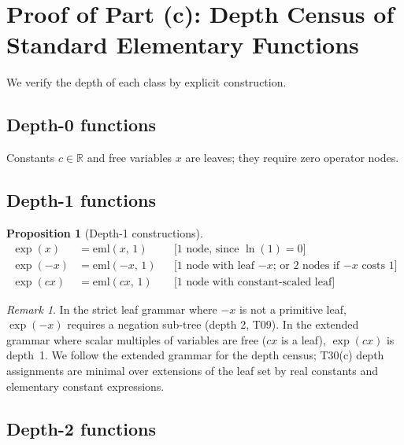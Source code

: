 \documentclass[12pt,a4paper]{article}
\newtheorem{proposition}[theorem]{Proposition}
\theoremstyle{definition}
\theoremstyle{remark}
\newtheorem{remark}[theorem]{Remark}
\begin{document}
\section{Proof of Part (c): Depth Census of Standard Elementary Functions}
\label{sec:census}

We verify the depth of each class by explicit construction.

\subsection{Depth-0 functions}

Constants $c\in\mathbb{R}$ and free variables $x$ are leaves; they require
zero operator nodes.

\subsection{Depth-1 functions}

\begin{proposition}[Depth-1 constructions]\label{prop:d1}
\begin{align*}
  \exp(x)     &= \mathrm{eml}(x,\,1)   &&\text{[1 node, since $\ln(1)=0$]}\\
  \exp(-x)    &= \mathrm{eml}(-x,\,1)  &&\text{[1 node with leaf $-x$; or 2 nodes if $-x$ costs 1]}\\
  \exp(cx)    &= \mathrm{eml}(cx,\,1)  &&\text{[1 node with constant-scaled leaf]}
\end{align*}
\end{proposition}

\begin{remark}
In the strict leaf grammar where $-x$ is not a primitive leaf, $\exp(-x)$
requires a negation sub-tree (depth 2, T09).  In the extended grammar
where scalar multiples of variables are free ($cx$ is a leaf), $\exp(cx)$
is depth~1.  We follow the extended grammar for the depth census;
T30(c) depth assignments are minimal over extensions of the leaf set by
real constants and elementary constant expressions.
\end{remark}

\subsection{Depth-2 functions}
\end{document}
